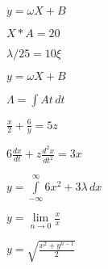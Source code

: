 \documentclass[12pt]{report}
\begin{document}
\vspace*{\fill}
\begin{center}
    \(
        y = \omega X + B
    \)
\end{center}
\vfill

\vspace*{\fill}
\begin{center}
    \(
    X*A=20
    \)
\end{center}
\vfill

\newpage

\vspace*{\fill}
\begin{center}
    \(
    \lambda/25 = 10\xi
    \)
\end{center}
\vfill

\vspace*{\fill}
\begin{center}
    \(
    y = \omega X + B
    \)
\end{center}
\vfill

\newpage

\vspace*{\fill}
\begin{center}
    \(
    \Lambda = \int A t\, dt
    \)
\end{center}
\vfill

\vspace*{\fill}
\begin{center}
    \(
    \frac{x}{2} + \frac{6}{y} = 5z
    \)
\end{center}
\vfill

\newpage

\vspace*{\fill}
\begin{center}
    \(
    6\frac{dx}{dt}+z\frac{d^2x}{dt^2} = 3x
    \)
\end{center}
\vfill

\vspace*{\fill}
\begin{center}
    \(
    y = \int\limits_{-\infty}^{\infty}6x^2+3\lambda\, dx
    \)
\end{center}
\vfill

\newpage

\vspace*{\fill}
\begin{center}
    \(
    y = \lim\limits_{n\to 0}\frac{x}{x}
    \)
\end{center}
\vfill

\vspace*{\fill}
\begin{center}
	\(
	y = \sqrt{\frac{x^2 + y^{n-1}}{2}}
	\)
\end{center}
\vfill
\end{document}
